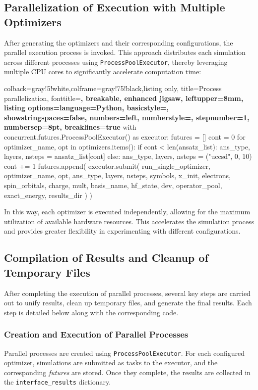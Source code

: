 \subsection{Parallelization of Execution with Multiple Optimizers}
After generating the optimizers and their corresponding configurations, the parallel execution process is invoked. This approach distributes each simulation across different processes using \texttt{ProcessPoolExecutor}, thereby leveraging multiple CPU cores to significantly accelerate computation time:


\begin{tcblisting}{colback=gray!5!white,colframe=gray!75!black,listing only,
    title=Process parallelization, fonttitle=\bfseries, breakable, enhanced jigsaw, leftupper=8mm,
    listing options={language=Python, basicstyle=\ttfamily\small,
    showstringspaces=false, numbers=left, numberstyle=\footnotesize,
    stepnumber=1, numbersep=8pt, breaklines=true}}
with concurrent.futures.ProcessPoolExecutor() as executor:
    futures = []
    cont = 0
    for optimizer_name, opt in optimizers.items():
        if cont < len(ansatz_list):
            ans_type, layers, nsteps = ansatz_list[cont]
        else:
            ans_type, layers, nsteps = ("uccsd", 0, 10)
        cont += 1
        futures.append(
            executor.submit(
                run_single_optimizer,
                optimizer_name, opt, ans_type, layers, nsteps, symbols, x_init, electrons, spin_orbitals, charge,
                mult, basis_name, hf_state, dev, operator_pool, exact_energy, results_dir
            )
        )
\end{tcblisting}

In this way, each optimizer is executed independently, allowing for the maximum utilization of available hardware resources. This accelerates the simulation process and provides greater flexibility in experimenting with different configurations.

\subsection{Compilation of Results and Cleanup of Temporary Files}
After completing the execution of parallel processes, several key steps are carried out to unify results, clean up temporary files, and generate the final results. Each step is detailed below along with the corresponding code.

\subsubsection{Creation and Execution of Parallel Processes}
Parallel processes are created using \texttt{ProcessPoolExecutor}. For each configured optimizer, simulations are submitted as tasks to the executor, and the corresponding \emph{futures} are stored. Once they complete, the results are collected in the \texttt{interface\_results} dictionary.

